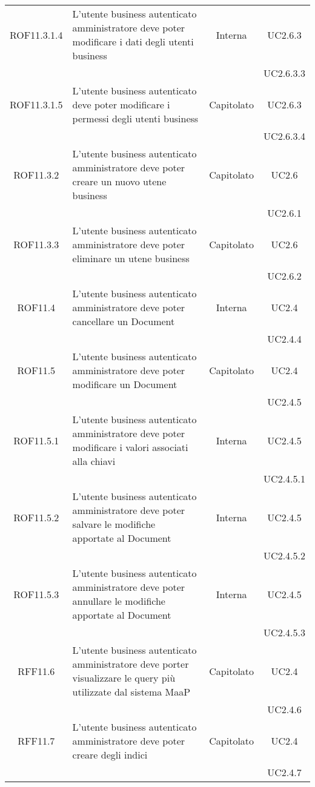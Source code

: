 \begin{longtable}{|c|p{6cm}|c|c|}
\midrule
ROF11.3.1.4
& L'utente business autenticato amministratore deve poter modificare i dati degli utenti business
& Interna
& UC2.6.3\\
& & & UC2.6.3.3
\\

\midrule
ROF11.3.1.5
& L'utente business autenticato deve poter modificare i permessi degli utenti business
& Capitolato
& UC2.6.3\\
& & & UC2.6.3.4
\\

\midrule
ROF11.3.2
& L'utente business autenticato amministratore deve poter creare un nuovo utene business
& Capitolato
& UC2.6\\
& & & UC2.6.1
\\

\midrule
ROF11.3.3
& L'utente business autenticato amministratore deve poter eliminare un utene business
& Capitolato
& UC2.6\\
& & & UC2.6.2
\\

\midrule
ROF11.4
& L'utente business autenticato amministratore deve poter cancellare un Document
& Interna
& UC2.4\\
& & & UC2.4.4
\\

\midrule
ROF11.5
& L'utente business autenticato amministratore deve poter modificare un Document
& Capitolato
& UC2.4\\
& & & UC2.4.5
\\

\midrule
ROF11.5.1
& L'utente business autenticato amministratore deve poter modificare i valori associati alla chiavi
& Interna
& UC2.4.5\\
& & & UC2.4.5.1
\\

\midrule
ROF11.5.2
& L'utente business autenticato amministratore deve poter salvare le modifiche apportate al Document
& Interna
& UC2.4.5\\
& & & UC2.4.5.2
\\

\midrule
ROF11.5.3
& L'utente business autenticato amministratore deve poter annullare le modifiche apportate al Document
& Interna
& UC2.4.5\\
& & & UC2.4.5.3
\\

\midrule
RFF11.6
& L'utente business autenticato amministratore deve porter visualizzare le query più utilizzate dal sistema MaaP
& Capitolato
& UC2.4\\
& & & UC2.4.6
\\

\midrule
RFF11.7
& L'utente business autenticato amministratore deve poter creare degli indici
& Capitolato
& UC2.4\\
& & & UC2.4.7
\\

\end{longtable}

